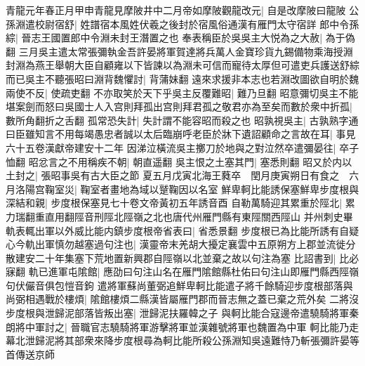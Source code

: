 青龍元年春正月甲申青龍見摩陂井中二月帝如摩陂觀龍改元|{
	自是改摩陂曰龍陂}
公孫淵遣校尉宿舒|{
	姓譜宿本風姓伏羲之後封於宿風俗通漢有雁門太守宿詳}
郎中令孫綜|{
	晉志王國置郎中令淵未封王潛置之也}
奉表稱臣於吳吳主大悦為之大赦|{
	為于偽翻}
三月吳主遣太常張彌執金吾許晏將軍賀達將兵萬人金寶珍貨九錫備物乘海授淵封淵為燕王舉朝大臣自顧雍以下皆諫以為淵未可信而寵待太厚但可遣吏兵護送舒綜而已吳主不聽張昭曰淵背魏懼討|{
	背蒲妹翻}
遠來求援非本志也若淵改圖欲自明於魏兩使不反|{
	使疏吏翻}
不亦取笑於天下乎吳主反覆難昭|{
	難乃旦翻}
昭意彌切吳主不能堪案劍而怒曰吳國士人入宫則拜孤出宫則拜君孤之敬君亦為至矣而數於衆中折孤|{
	數所角翻折之舌翻}
孤常恐失計|{
	失計謂不能容昭而殺之也}
昭孰視吳主|{
	古孰熟字通}
曰臣雖知言不用每竭愚忠者誠以太后臨崩呼老臣於牀下遺詔顧命之言故在耳|{
	事見六十五卷漢獻帝建安十二年}
因涕泣橫流吳主擲刀於地與之對泣然卒遣彌晏往|{
	卒子恤翻}
昭忿言之不用稱疾不朝|{
	朝直遥翻}
吳主恨之土塞其門|{
	塞悉則翻}
昭又於内以土封之|{
	張昭事吳有古大臣之節}
夏五月戊寅北海王蕤卒　閏月庚寅朔日有食之　六月洛陽宫鞠室災|{
	鞠室者畫地為域以蹵鞠因以名室}
鮮卑軻比能誘保塞鮮卑步度根與深結和親|{
	步度根保塞見七十卷文帝黃初五年誘音酉}
自勒萬騎迎其累重於陘北|{
	累力瑞翻重直用翻陘音刑陘北陘嶺之北也唐代州雁門縣有東陘關西陘山}
并州刺史畢軌表輒出軍以外威比能内鎮步度根帝省表曰|{
	省悉景翻}
步度根已為比能所誘有自疑心今軌出軍慎勿越塞過句注也|{
	漢靈帝末羌胡大擾定襄雲中五原朔方上郡並流徙分散建安二十年集塞下荒地置新興郡自陘嶺以北並棄之故以句注為塞}
比詔書到|{
	比必寐翻}
軌已進軍屯隂館|{
	應劭曰句注山名在雁門隂館縣杜佑曰句注山即雁門縣西陘嶺句伏儼音俱包愷音鉤}
遣將軍蘇尚董弼追鮮卑軻比能遣子將千餘騎迎步度根部落與尚弼相遇戰於樓煩|{
	隂館樓煩二縣漢皆屬雁門郡而晉志無之蓋已棄之荒外矣}
二將沒步度根與泄歸泥部落皆叛出塞|{
	泄歸泥扶羅韓之子}
與軻比能合寇邊帝遣驍騎將軍秦朗將中軍討之|{
	晉職官志驍騎將軍游擊將軍並漢雜號將軍也魏置為中軍}
軻比能乃走幕北泄歸泥將其部衆來降步度根尋為軻比能所殺公孫淵知吳遠難恃乃斬張彌許晏等首傳送京師

